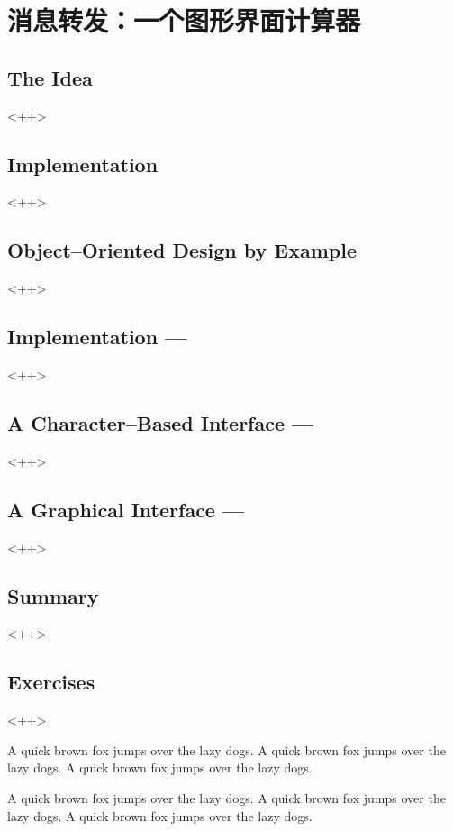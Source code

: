 

\chapter{消息转发：一个图形界面计算器}
\label{ch:ForwardingMessages}

\section{The Idea}<++>

\section{Implementation}<++>

\section{Object--Oriented Design by Example}<++>

\section{Implementation ---}<++>

\section{A Character--Based Interface ---}<++>

\section{A Graphical Interface ---}<++>

\section{Summary}<++>

\section{Exercises}<++>

A quick brown fox jumps over the lazy dogs.
A quick brown fox jumps over the lazy dogs.
A quick brown fox jumps over the lazy dogs.

A quick brown fox jumps over the lazy dogs.
A quick brown fox jumps over the lazy dogs.
A quick brown fox jumps over the lazy dogs.


